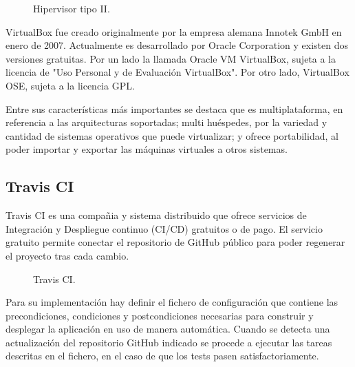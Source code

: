 \begin{figure}[H]
\caption{Hipervisor tipo II.\label{fig:figure_placement_example}}
\end{figure}

VirtualBox fue creado originalmente por la empresa alemana Innotek GmbH en enero de 2007. Actualmente es desarrollado por Oracle Corporation y existen dos versiones gratuitas. Por un lado la llamada Oracle VM VirtualBox, sujeta a la licencia de "Uso Personal y de Evaluación VirtualBox". Por otro lado, VirtualBox OSE, sujeta a la licencia GPL.

Entre sus características más importantes se destaca que es multiplataforma, en referencia a las arquitecturas soportadas; multi huéspedes, por la variedad y cantidad de sistemas operativos que puede virtualizar; y ofrece portabilidad, al poder importar y exportar las máquinas virtuales a otros sistemas.

\subsection{Travis CI}

Travis CI es una compañia y sistema distribuido que ofrece servicios de Integración y Despliegue continuo (CI/CD) gratuitos o de pago. El servicio gratuito permite conectar el repositorio de GitHub público para poder regenerar el proyecto tras cada cambio. 

\begin{figure}[H]
\caption{Travis CI.\label{fig:figure_placement_example}}
\end{figure}

Para su implementación hay definir el fichero de configuración  que contiene las precondiciones, condiciones y postcondiciones necesarias para construir y desplegar la aplicación en uso de manera automática. Cuando se detecta una actualización del repositorio GitHub indicado se procede a ejecutar las tareas descritas en el fichero, en el caso de que los tests pasen satisfactoriamente.



